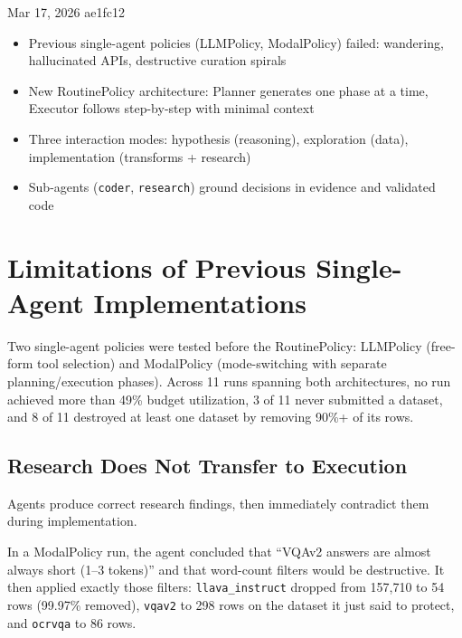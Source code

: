 \meetingheader
    {Mar 17, 2026}
    {ae1fc12}
    {}
    {\begin{itemize}
        \item Previous single-agent policies (LLMPolicy, ModalPolicy) failed: wandering, hallucinated APIs, destructive curation spirals
        \item New RoutinePolicy architecture: Planner generates one phase at a time, Executor follows step-by-step with minimal context
        \item Three interaction modes: hypothesis (reasoning), exploration (data), implementation (transforms + research)
        \item Sub-agents (\texttt{coder}, \texttt{research}) ground decisions in evidence and validated code
    \end{itemize}}
    {}


\section{Limitations of Previous Single-Agent Implementations}

Two single-agent policies were tested before the RoutinePolicy: LLMPolicy (free-form tool selection) and ModalPolicy (mode-switching with separate planning/execution phases). Across 11 runs spanning both architectures, no run achieved more than 49\% budget utilization, 3 of 11 never submitted a dataset, and 8 of 11 destroyed at least one dataset by removing 90\%+ of its rows.

\subsection{Research Does Not Transfer to Execution}

Agents produce correct research findings, then immediately contradict them during implementation.

In a ModalPolicy run, the agent concluded that ``VQAv2 answers are almost always short (1--3 tokens)'' and that word-count filters would be destructive. It then applied exactly those filters: \texttt{llava\_instruct} dropped from 157,710 to 54 rows (99.97\% removed), \texttt{vqav2} to 298 rows on the dataset it just said to protect, and \texttt{ocrvqa} to 86 rows.

